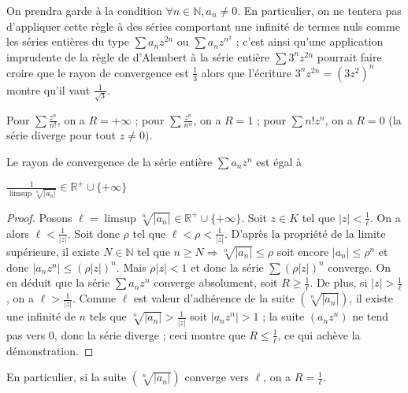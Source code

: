 \begin{rem}
On prendra garde à la condition
$\forall n \in \mathbb{N}, a_n \neq 0$. En particulier, on ne tentera
pas d'appliquer cette règle à des séries comportant une infinité de
termes nuls comme les séries entières du type
$\sum a_n z^{2n}$ ou
$\sum a_n z^{n^2}$ ; c'est ainsi qu'une
application imprudente de la règle de d'Alembert à la série entière
$\sum 3^n z^{2n}$ pourrait faire croire que le rayon de
convergence est $\frac{1}{3}$ alors que l'écriture
$3^n z^{2n} = (3z^2)^n$
montre qu'il vaut $\frac{1}{\sqrt{3}}$.
\end{rem}

\begin{example}
Pour $\sum \frac{z^n}{n!}$, on a $R = +\infty$ ; pour
$\sum \frac{z^n}{n^\alpha}$, on a $R = 1$ ; pour
$\sum n! z^n$, on a $R = 0$ (la série diverge pour tout $z \neq 0$).
\end{example}

\begin{thm}
Le rayon de convergence de la série
entière $\sum a_n z^n$ est égal à

$\frac{1}{\limsup \sqrt[n]{|a_n|}} \in \mathbb{R}^+ \cup \{+\infty\}$
\end{thm}

\begin{proof}
Posons $\ell = \limsup \sqrt[n]{|a_n|} \in \mathbb{R}^+ \cup \{+\infty\}$. Soit $z \in K$
tel que $|z| < \frac{1}{\ell}$.
On a alors $\ell < \frac{1}{|z|}$. Soit donc $\rho$ tel que $\ell < \rho < \frac{1}{|z|}$. D'après
la propriété de la limite supérieure, il existe $N \in \mathbb{N}$ tel que $n \geq N
\Rightarrow \sqrt[n]{|a_n|} \leq \rho$ soit encore
$|a_n| \leq \rho^n$ et donc
$|a_n z^n| \leq (\rho |z|)^n$. Mais $\rho |z| < 1$ et donc la série
$\sum (\rho |z|)^n$ converge. On en déduit que la
série $\sum a_n z^n$ converge absolument, soit $R \geq \frac{1}{\ell}$. De plus, si $|z| > \frac{1}{\ell}$, on a $\ell > \frac{1}{|z|}$. Comme $\ell$ est valeur
d'adhérence de la suite
$(\sqrt[n]{|a_n|})$,
il existe une infinité de $n$ tels que
$\sqrt[n]{|a_n|} > \frac{1}{|z|}$ soit
$|a_n z^n| > 1$ ; la suite $(a_n z^n)$ ne tend pas
vers $0$, donc la série diverge ; ceci montre que $R \leq \frac{1}{\ell}$, ce qui achève la démonstration.
\end{proof}

\begin{rem}
En particulier, si la suite
$(\sqrt[n]{|a_n|})$
converge vers $\ell$, on a $R = \frac{1}{\ell}$.
\end{rem}

